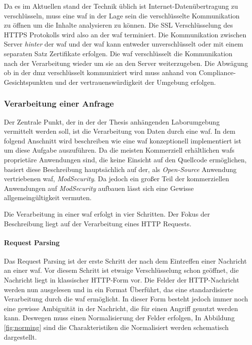 Da es im Aktuellen stand der Technik üblich ist Internet-Datenübertragung zu verschlüsseln, muss eine \ac{waf} in der Lage sein die verschlüsselte Kommunikation zu öffnen um die Inhalte analysieren zu können.
Die SSL Verschlüsselung des HTTPS Protokolls wird also an der \ac{waf} terminiert.
Die Kommunikation zwischen Server \textit{hinter} der \ac{waf} und der \ac{waf} kann entweder unverschlüsselt oder mit einem separaten Satz Zertifikate erfolgen.
Die \ac{waf} verschlüsselt die Kommunikation nach der Verarbeitung wieder um sie an den Server weiterzugeben.
Die Abwägung ob in der \ac{dmz} verschlüsselt kommuniziert wird muss anhand von Compliance-Gesichtspunkten und der vertrauenswürdigkeit der Umgebung erfolgen.

\subsubsection{Verarbeitung einer Anfrage}
Der Zentrale Punkt, der in der der Thesis anhängenden Laborumgebung vermittelt werden soll, ist die Verarbeitung von Daten durch eine \ac{waf}.
In dem folgend Anschnitt wird beschreiben wie eine \ac{waf} konzeptionell implementiert ist um diese Aufgabe auszuführen.
Da die meisten Kommerziell erhältlichen \acp{waf} proprietäre Anwendungen sind, die keine Einsicht auf den Quellcode ermöglichen, basiert diese Beschreibung hauptsächlich auf der, als \textit{Open-Source} Anwendung vertriebenen \ac{waf}, \textit{ModSecurity}.
Da jedoch ein großer Teil der kommerziellen Anwendungen auf \textit{ModSecurity} aufbauen lässt sich eine Gewisse allgemeingültigkeit vermuten.

Die Verarbeitung in einer \ac{waf} erfolgt in vier Schritten. Der Fokus der Beschreibung liegt auf der Verarbeitung eines HTTP Requests.

\paragraph{Request Parsing}

Das Request Parsing ist der erste Schritt der nach dem Eintreffen einer Nachricht an einer \ac{waf}.
Vor diesem Schritt ist etwaige Verschlüsselung schon geöffnet, die Nachricht liegt in klassischer HTTP-Form vor.
Die Felder der HTTP-Nachricht werden nun ausgelesen und in ein Format Überführt, das eine standardisierte Verarbeitung durch die \ac{waf} ermöglicht.
In dieser Form besteht jedoch immer noch eine gewisse Ambiguität in der Nachricht, die für einen Angriff genutzt werden kann.
Deswegen muss einen Normalisierung der Felder erfolgen,
In Abbildung \ref{fig:norming} sind die Charakteristiken die Normalisiert werden schematisch dargestellt.

